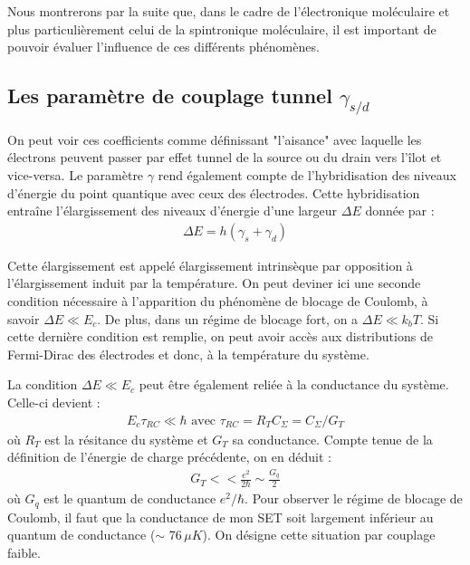 Nous montrerons par la suite que, dans le cadre de l'électronique moléculaire et plus particulièrement celui de la spintronique moléculaire, il est important de pouvoir évaluer l'influence de ces différents phénomènes.

\subsection{Les paramètre de couplage tunnel $\gamma_{s/d}$}

On peut voir ces coefficients comme définissant "l'aisance" avec laquelle les électrons peuvent passer par effet tunnel de la source ou du drain vers l'\^ilot et vice-versa. Le paramètre $\gamma$ rend également compte de l'hybridisation des niveaux d'énergie du point quantique avec ceux des électrodes. Cette hybridisation entraîne l'élargissement des niveaux d'énergie d'une largeur $\Delta E$ donnée par :
\begin{eqnarray}
\Delta E = h (\gamma_s + \gamma_d)
\label{hybridgamma}
\end{eqnarray}

Cette élargissement est appelé élargissement intrinsèque par opposition à l'élargissement induit par la température. On peut deviner ici une seconde condition nécessaire à l'apparition du phénomène de blocage de Coulomb, à savoir $\Delta E \ll E_c$. De plus, dans un régime de blocage fort, on a $\Delta E \ll k_bT$. Si cette dernière condition est remplie, on peut avoir accès aux distributions de Fermi-Dirac des électrodes et donc, à la température du système.

La condition $\Delta E \ll E_c$ peut \^etre également reliée à la conductance du système. Celle-ci devient :
\begin{eqnarray}
E_c \tau_{RC} \ll \hbar \text{  avec  } \tau_{RC}=R_TC_{\Sigma}=C_{\Sigma}/G_T \nonumber
\end{eqnarray}
où $R_T$ est la résitance du système et $G_T$ sa conductance. Compte tenue de la définition de l'énergie de charge précédente, on en déduit :
\begin{eqnarray}
G_T << \frac{e^2}{2\hbar} \sim \frac{G_q}{2}
\end{eqnarray}
où $G_q$ est le quantum de conductance $e^2/ \hbar$. Pour observer le régime de blocage de Coulomb, il faut que la conductance de mon SET soit largement inférieur au quantum de conductance ($\sim$ 76\,$\mu K$). On désigne cette situation par couplage faible.


